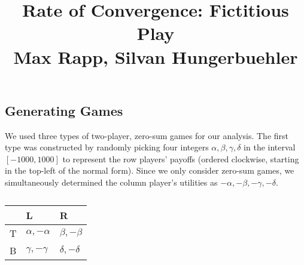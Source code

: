 \documentclass[10pt,a4paper]{article}
\title{%
  Rate of Convergence: Fictitious Play \\
  \large Max Rapp, Silvan Hungerbuehler}
\date{}
\begin{document}
\maketitle

\subsection*{Generating Games}
We used three types of two-player, zero-sum games for our analysis. The first type was constructed by randomly picking four integers  $\alpha,\beta,\gamma,\delta$ in the interval $[-1000,1000]$ to represent the row players' payoffs (ordered clockwise, starting in the top-left of the normal form). Since we only consider zero-sum games, we simultaneously determined the column player's utilities as $-\alpha,-\beta,-\gamma,-\delta$.
\begin{table}[h]
\centering
\caption{}
\begin{tabular}{|l|l|l|}
\hline
  & L                & R                \\ \hline
T & $\alpha,-\alpha$ & $\beta,-\beta$   \\ \hline
B & $\gamma,-\gamma$ & $\delta,-\delta$ \\ \hline
\end{tabular}
\end{table}
\end{document}

